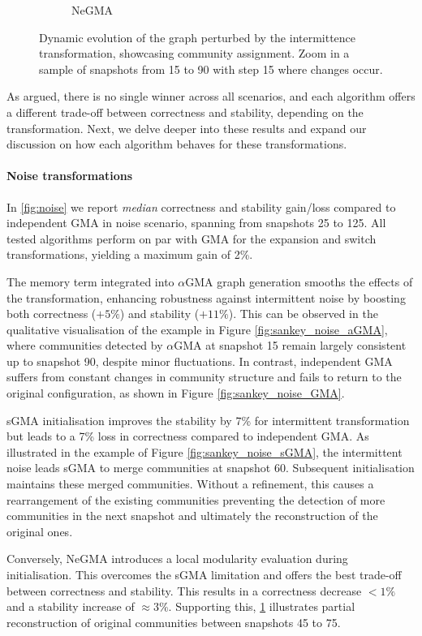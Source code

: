 \documentclass[letterpaper]{article}
\begin{document}
\begin{figure}[!t]
\begin{subfigure}[b]{.24\linewidth}
        \caption{NeGMA}
        \label{fig:sankey_noise_neGMA}
    \end{subfigure}
    \caption{Dynamic evolution of the graph perturbed by the intermittence transformation, showcasing community assignment. Zoom in a sample of snapshots from 15 to 90 with step 15 where changes occur.}
    \label{fig:sankey_intermittence}
\end{figure}
As argued, there is no single winner across all scenarios, and each algorithm offers a different trade-off between correctness and stability, depending on the transformation. Next, we delve deeper into these results and expand our discussion on how each algorithm behaves for these transformations.

\paragraph*{Noise transformations}
In \cref{fig:noise} we report {\it median} correctness and stability gain/loss compared to independent GMA in noise scenario, spanning from snapshots 25 to 125.
All tested algorithms perform on par with GMA for the expansion and switch transformations, yielding a maximum gain of 2\%.

The memory term integrated into $\alpha$GMA graph generation smooths the effects of the transformation, enhancing robustness against intermittent noise by boosting both correctness ($+5\%$) and stability ($+11\%$).
This can be observed in the qualitative visualisation of the example in Figure \ref{fig:sankey_noise_aGMA}, where communities detected by $\alpha$GMA at snapshot 15 remain largely consistent up to snapshot 90, despite minor fluctuations. In contrast, independent GMA suffers from constant changes in community structure and fails to return to the original configuration, as shown in Figure \ref{fig:sankey_noise_GMA}.

sGMA initialisation improves the stability by 7\% for intermittent transformation but leads to a 7\% loss in correctness compared to independent GMA. As illustrated in the example of Figure \ref{fig:sankey_noise_sGMA}, the intermittent noise leads sGMA to merge communities at snapshot 60. Subsequent initialisation maintains these merged communities. Without a refinement, this causes a rearrangement of the existing communities preventing the detection of more communities in the next snapshot and ultimately the reconstruction of the original ones.

Conversely, NeGMA introduces a local modularity evaluation during initialisation. This overcomes the sGMA limitation and offers the best trade-off between correctness and stability. This results in a correctness decrease $<1\%$ and a stability increase of $\approx 3\%$.  Supporting this, \cref{fig:sankey_noise_neGMA} illustrates partial reconstruction of original communities between snapshots 45 to 75.
\end{document}
